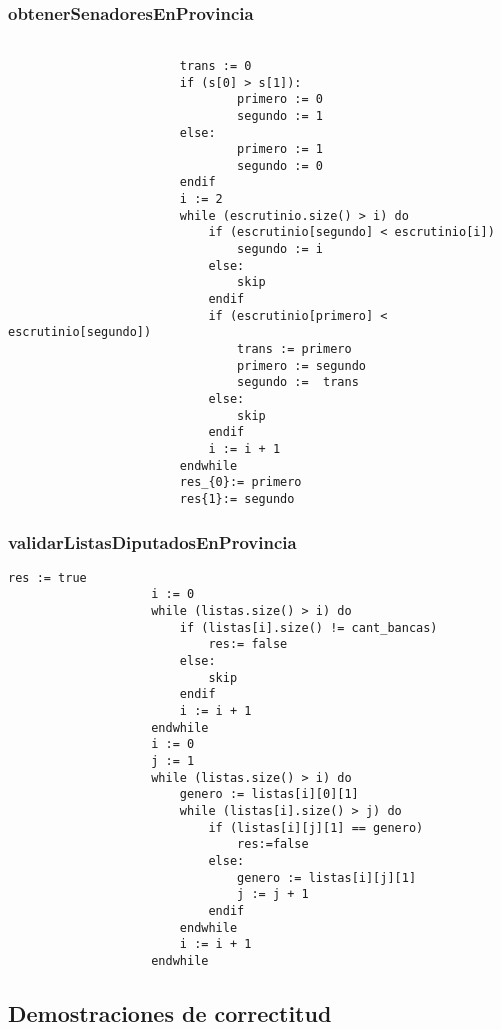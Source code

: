 \documentclass[10pt,a4paper]{article}
\begin{document}
		\subsubsection{obtenerSenadoresEnProvincia}
			\begin{minipage}[t]{\textwidth}
				\begin{lstlisting}[caption={()},label=code:for]
						
						trans := 0
						if (s[0] > s[1]):
    							primero := 0
    							segundo := 1
						else:
    							primero := 1
    							segundo := 0
						endif
						i := 2
						while (escrutinio.size() > i) do
							if (escrutinio[segundo] < escrutinio[i])
								segundo := i
							else:
								skip
							endif
							if (escrutinio[primero] < escrutinio[segundo])
								trans := primero
								primero := segundo
								segundo :=  trans
							else:
								skip
							endif
							i := i + 1
						endwhile	
						res_{0}:= primero
                        res{1}:= segundo
				\end{lstlisting}
			\end{minipage}
	
		\subsubsection{validarListasDiputadosEnProvincia}
			\begin{minipage}[t]{\textwidth}
				\begin{lstlisting}[caption={()},label=code:for]
					res := true
					i := 0
					while (listas.size() > i) do
						if (listas[i].size() != cant_bancas) 
							res:= false
						else:
							skip
						endif
						i := i + 1
					endwhile
					i := 0
					j := 1
					while (listas.size() > i) do
						genero := listas[i][0][1]
						while (listas[i].size() > j) do
							if (listas[i][j][1] == genero) 
								res:=false
							else:
								genero := listas[i][j][1]
								j := j + 1
							endif
						endwhile
						i := i + 1
					endwhile
				\end{lstlisting}
			\end{minipage}
		
	\subsection{Demostraciones de correctitud}
\end{document}
